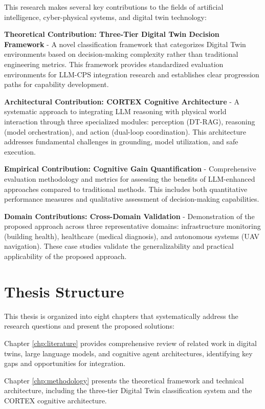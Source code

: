 This research makes several key contributions to the fields of artificial intelligence, cyber-physical systems, and digital twin technology:

\textbf{Theoretical Contribution: Three-Tier Digital Twin Decision Framework} - A novel classification framework that categorizes Digital Twin environments based on decision-making complexity rather than traditional engineering metrics. This framework provides standardized evaluation environments for LLM-CPS integration research and establishes clear progression paths for capability development.

\textbf{Architectural Contribution: CORTEX Cognitive Architecture} - A systematic approach to integrating LLM reasoning with physical world interaction through three specialized modules: perception (DT-RAG), reasoning (model orchestration), and action (dual-loop coordination). This architecture addresses fundamental challenges in grounding, model utilization, and safe execution.

\textbf{Empirical Contribution: Cognitive Gain Quantification} - Comprehensive evaluation methodology and metrics for assessing the benefits of LLM-enhanced approaches compared to traditional methods. This includes both quantitative performance measures and qualitative assessment of decision-making capabilities.

\textbf{Domain Contributions: Cross-Domain Validation} - Demonstration of the proposed approach across three representative domains: infrastructure monitoring (building health), healthcare (medical diagnosis), and autonomous systems (UAV navigation). These case studies validate the generalizability and practical applicability of the proposed approach.

\section{Thesis Structure}

This thesis is organized into eight chapters that systematically address the research questions and present the proposed solutions:

Chapter \ref{chp:literature} provides comprehensive review of related work in digital twins, large language models, and cognitive agent architectures, identifying key gaps and opportunities for integration.

Chapter \ref{chp:methodology} presents the theoretical framework and technical architecture, including the three-tier Digital Twin classification system and the CORTEX cognitive architecture.

